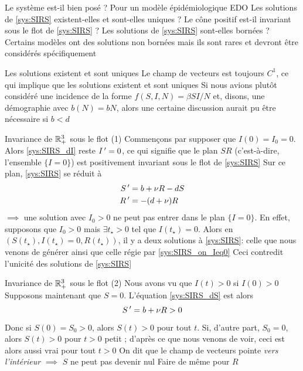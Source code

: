\documentclass[aspectratio=169]{beamer}\usepackage[]{graphicx}\usepackage[]{xcolor}
\begin{document}
\begin{frame}{Le système est-il bien posé ?} 
Pour un modèle épidémiologique EDO
\vfill
\bbullet Les solutions de \eqref{sys:SIRS} existent-elles et sont-elles uniques ?
\vfill
\bbullet Le cône positif est-il invariant sous le flot de \eqref{sys:SIRS} ?
\vfill
\bbullet Les solutions de \eqref{sys:SIRS} sont-elles bornées ?
Certains modèles ont des solutions non bornées mais ils sont rares et devront être considérés spécifiquement
\end{frame}

\begin{frame}{Les solutions existent et sont uniques}
\bbullet Le champ de vecteurs est toujours $C^1$, ce qui implique que les solutions existent et sont uniques
\vfill
Si nous avions plutôt considéré une incidence de la forme $f(S,I,N)=\beta SI/N$ et, disons, une démographie avec $b(N)=bN$, alors une certaine discussion aurait pu être nécessaire si $b<d$
\end{frame}


\begin{frame}{Invariance de $\mathbb{R}_+^3$ sous le flot (1)}
Commençons par supposer que $I(0)=I_0=0$. Alors \eqref{sys:SIRS_dI} reste $I\,'=0$, ce qui signifie que le plan $SR$ (c'est-à-dire, l'ensemble $\{I=0\}$) est positivement invariant sous le flot de \eqref{sys:SIRS}
\vfill
Sur ce plan, \eqref{sys:SIRS} se réduit à
\begin{subequations}\label{sys:SIRS_on_Ieq0}
\begin{align}
S\,' &= b+\nu R-dS \\
R\,' &= -(d+\nu)R
\end{align}    
\end{subequations}
\vfill
$\implies$ une solution avec $I_0>0$ ne peut pas entrer dans le plan $\{I=0\}$. En effet, supposons que $I_0>0$ mais $\exists t_\star>0$ tel que $I(t_\star)=0$. Alors en $(S(t_\star),I(t_\star)=0,R(t_\star))$, il y a deux solutions à \eqref{sys:SIRS}: celle que nous venons de générer ainsi que celle régie par \eqref{sys:SIRS_on_Ieq0}
\vfill
Ceci contredit l'unicité des solutions de \eqref{sys:SIRS}
\end{frame}

\begin{frame}{Invariance de $\mathbb{R}_+^3$ sous le flot (2)} 
Nous avons vu que $I(t)>0$ si $I(0)>0$
\vfill
Supposons maintenant que $S=0$. L'équation \eqref{sys:SIRS_dS} est alors
$$
S\,' = b+\nu R>0
$$
\vfill
Donc si $S(0)=S_0>0$, alors $S(t)>0$ pour tout $t$. Si, d'autre part, $S_0=0$, alors $S(t)>0$ pour $t>0$ petit ; d'après ce que nous venons de voir, ceci est alors aussi vrai pour tout $t>0$
\vfill
On dit que le champ de vecteurs pointe \emph{vers l'intérieur}
\vfill
$\implies$ $S$ ne peut pas devenir nul
\vfill
Faire de même pour $R$
\end{frame}
\end{document}
